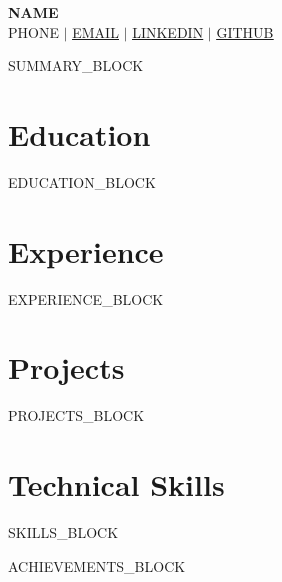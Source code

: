 \documentclass[letterpaper,11pt]{article}
\newcommand{\resumeSubHeadingListStart}{\begin{itemize}[leftmargin=0.15in, label={}]}
\newcommand{\resumeSubHeadingListEnd}{\end{itemize}}
\begin{document}
\begin{center}
    \textbf{\Huge \scshape {{NAME}} } \\ \vspace{1pt}
    \small {{PHONE}} $|$ \href{mailto:{{EMAIL}}}{\underline{{{EMAIL}}}} $|$
    \href{https://{{LINKEDIN}}}{\underline{{{LINKEDIN}}}} $|$
    \href{https://{{GITHUB}}}{\underline{{{GITHUB}}}}
\end{center}

{{SUMMARY_BLOCK}}

\section{Education}
  \resumeSubHeadingListStart
{{EDUCATION_BLOCK}}
  \resumeSubHeadingListEnd

\section{Experience}
  \resumeSubHeadingListStart
{{EXPERIENCE_BLOCK}}
  \resumeSubHeadingListEnd

\section{Projects}
    \resumeSubHeadingListStart
{{PROJECTS_BLOCK}}
    \resumeSubHeadingListEnd

\section{Technical Skills}
 \begin{itemize}[leftmargin=0.15in, label={}]
    \small{\item{
{{SKILLS_BLOCK}}
    }}
 \end{itemize}

{{ACHIEVEMENTS_BLOCK}}
\end{document}
